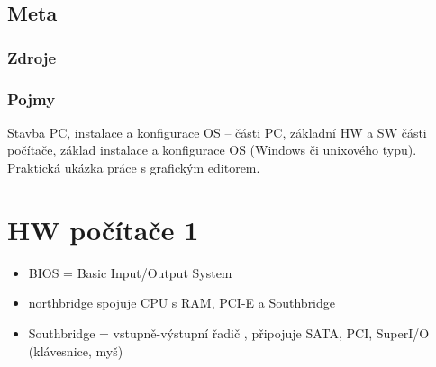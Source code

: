 \documentclass[12pt]{article}
\begin{document}
\subsection{Meta}
\subsubsection{Zdroje}
\subsubsection{Pojmy}
Stavba PC, instalace a konfigurace OS – části PC, základní HW a SW části počítače, základ instalace a konfigurace OS (Windows či unixového typu). Praktická ukázka práce s grafickým editorem.

\section{HW počítače 1}
\begin{itemize}
\item BIOS = Basic Input/Output System
\item northbridge spojuje CPU s RAM, PCI-E a Southbridge
\item Southbridge = vstupně-výstupní řadič , připojuje SATA, PCI, SuperI/O (klávesnice, myš)
\end{itemize}
\end{document}

